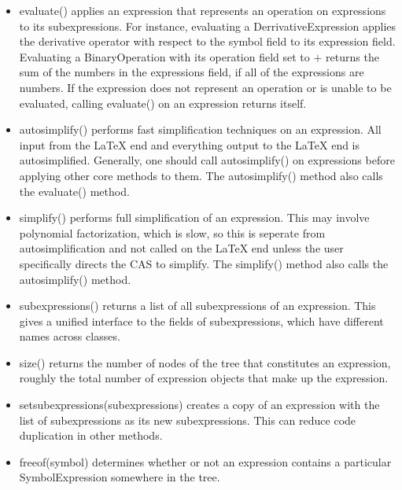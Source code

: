 \documentclass{article}
\begin{document}
\begin{itemize}
    \item {\ttfamily evaluate()} applies an expression that represents an operation on expressions to its subexpressions. For instance, evaluating a {\ttfamily DerrivativeExpression} applies the derivative operator with respect to the {\ttfamily symbol} field to its {\ttfamily expression} field. Evaluating a {\ttfamily BinaryOperation} with its {\ttfamily operation} field set to $+$ returns the sum of the numbers in the {\ttfamily expressions} field, if all of the expressions are numbers. If the expression does not represent an operation or is unable to be evaluated, calling {\ttfamily evaluate()} on an expression returns itself.
    
    \item {\ttfamily autosimplify()} performs fast simplification techniques on an expression. All input from the \LaTeX{} end and everything output to the \LaTeX{} end is autosimplified. Generally, one should call {\ttfamily autosimplify()} on expressions before applying other core methods to them. The {\ttfamily autosimplify()} method also calls the {\ttfamily evaluate()} method.
    
    \item {\ttfamily simplify()} performs full simplification of an expression. This may involve polynomial factorization, which is slow, so this is seperate from autosimplification and not called on the \LaTeX{} end unless the user specifically directs the CAS to simplify. The {\ttfamily simplify()} method also calls the {\ttfamily autosimplify()} method.
    
    \item {\ttfamily subexpressions()} returns a list of all subexpressions of an expression. This gives a unified interface to the fields of subexpressions, which have different names across classes.
    
    \item {\ttfamily size()} returns the number of nodes of the tree that constitutes an expression, roughly the total number of expression objects that make up the expression.
    
    \item {\ttfamily setsubexpressions(subexpressions)} creates a copy of an expression with the list of subexpressions as its new subexpressions. This can reduce code duplication in other methods.
    
    \item {\ttfamily freeof(symbol)} determines whether or not an expression contains a particular \\ {\ttfamily SymbolExpression} somewhere in the tree.
    

\end{itemize}
\end{document}
